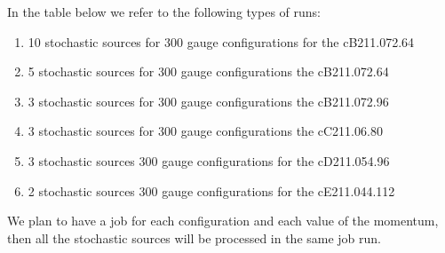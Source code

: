 In the table below we refer to the following types of runs:
\begin{enumerate}
	\item \label{rt:cB48} 10 stochastic sources for 300 gauge configurations for the cB211.072.64
	\item \label{rt:cB64} 5 stochastic sources for 300 gauge configurations the cB211.072.64
	\item \label{rt:cB96} 3 stochastic sources for 300 gauge configurations the cB211.072.96
	\item \label{rt:cC80} 3 stochastic sources for 300 gauge configurations the cC211.06.80
	\item \label{rt:cD96}  3 stochastic sources 300 gauge configurations for the cD211.054.96
	\item  \label{rt:cE112} 2 stochastic sources 300 gauge configurations for the cE211.044.112
\end{enumerate}
We plan to have a job for each configuration and each value of the momentum, then
all the stochastic sources will be processed in the same job run.

